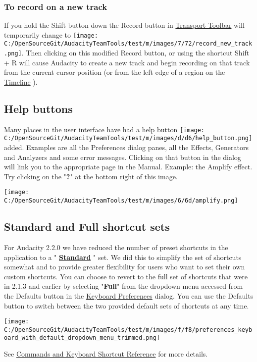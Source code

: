 \begin{multicols}{2}
\subsubsection{To record on a new track}If you hold the Shift button down the Record button in 
\hyperref[\foo{transport_toolbar_}]{Transport Toolbar}
 will temporarily change to \protect\texttt{[image: C:/OpenSourceGit/AudacityTeamTools/test/m/images/7/72/record\_new\_track.png]}. Then clicking on this modified Record button, or using the shortcut Shift + R will cause Audacity to create a new track and begin recording on that track from the current cursor position (or from the left edge of a region on the 
\hyperref[\foo{timeline_}]{Timeline}
). 

\label{new_features_in_this_release_help-buttons}
\subsection{Help buttons}Many places in the user interface have had a help button \protect\texttt{[image: C:/OpenSourceGit/AudacityTeamTools/test/m/images/d/d6/help\_button.png]} added. Examples are all the Preferences dialog panes, all the Effects, Generators and Analyzers and some error messages.
Clicking on that button in the dialog will link you to the appropriate page in the Manual.
Example: the Amplify effect.  Try clicking on the "\textbf{?}" at the bottom right of this image.
\par \protect\texttt{[image: C:/OpenSourceGit/AudacityTeamTools/test/m/images/6/6d/amplify.png]}\par 
\label{new_features_in_this_release_shortcuts}
\subsection{Standard and Full shortcut sets}For Audacity 2.2.0 we have reduced the number of preset shortcuts in the application to a "\textbf{
\hyperref[\foo{keyboard_shortcut_reference_}]{Standard}
}" set.  We did this to simplify the set of shortcuts somewhat and to provide greater flexibility for users who want to set their own custom shortcuts.
You can choose to revert to the full set of shortcuts that were in 2.1.3 and earlier by selecting "\textbf{Full}" from the dropdown menu accessed from the Defaults button in the 
\hyperref[\foo{keyboard_preferences_}]{Keyboard Preferences}
 dialog.
You can use the Defaults button to switch between the two provided default sets of shortcuts at any time.
\par \protect\texttt{[image: C:/OpenSourceGit/AudacityTeamTools/test/m/images/f/f8/preferences\_keyboard\_with\_default\_dropdown\_menu\_trimmed.png]}\par See 
\hyperref[\foo{keyboard_shortcut_reference_}]{Commands and Keyboard Shortcut Reference}
 for more details.


\end{multicols}
